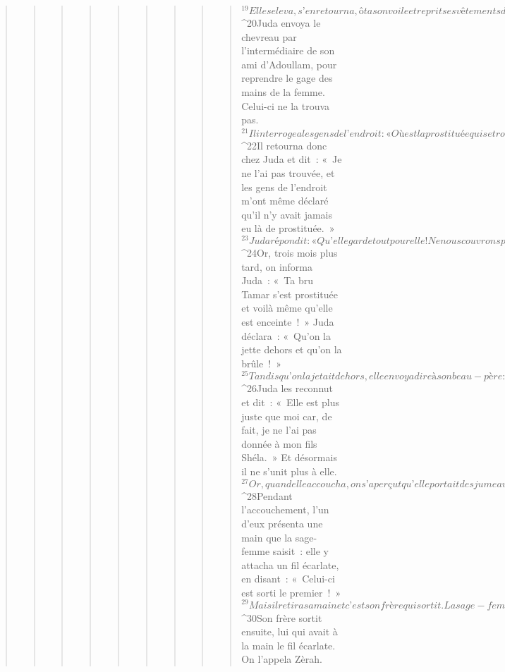 \begin{verse}
\begin{verse}
\begin{verse}
\begin{verse}
\begin{verse}
\begin{verse}
\begin{verse}
\begin{verse}
\begin{verse}
${}^{19}Elle se leva, s’en retourna, ôta son voile et reprit ses vêtements de veuve.
${}^{20}Juda envoya le chevreau par l’intermédiaire de son ami d’Adoullam, pour reprendre le gage des mains de la femme. Celui-ci ne la trouva pas. 
${}^{21}Il interrogea les gens de l’endroit : « Où est la prostituée qui se trouvait à Énaïm, au bord de la route ? » Ils répondirent : « Il n’y a jamais eu là de prostituée. » 
${}^{22}Il retourna donc chez Juda et dit : « Je ne l’ai pas trouvée, et les gens de l’endroit m’ont même déclaré qu’il n’y avait jamais eu là de prostituée. » 
${}^{23}Juda répondit : « Qu’elle garde tout pour elle ! Ne nous couvrons pas de ridicule, moi qui lui ai envoyé un chevreau, et toi qui ne l’as pas trouvée ! »
${}^{24}Or, trois mois plus tard, on informa Juda : « Ta bru Tamar s’est prostituée et voilà même qu’elle est enceinte ! » Juda déclara : « Qu’on la jette dehors et qu’on la brûle ! » 
${}^{25}Tandis qu’on la jetait dehors, elle envoya dire à son beau-père : « C’est de l’homme à qui appartiennent ces objets que je suis enceinte. » Et elle ajouta : « Regarde donc bien à qui appartiennent le sceau à cacheter, le cordon et le bâton que voici ! » 
${}^{26}Juda les reconnut et dit : « Elle est plus juste que moi car, de fait, je ne l’ai pas donnée à mon fils Shéla. » Et désormais il ne s’unit plus à elle.
${}^{27}Or, quand elle accoucha, on s’aperçut qu’elle portait des jumeaux. 
${}^{28}Pendant l’accouchement, l’un d’eux présenta une main que la sage-femme saisit : elle y attacha un fil écarlate, en disant : « Celui-ci est sorti le premier ! » 
${}^{29}Mais il retira sa main et c’est son frère qui sortit. La sage-femme dit : « Quelle brèche tu as ouverte ! » Et on l’appela Pérès (c’est-à-dire : Brèche). 
${}^{30}Son frère sortit ensuite, lui qui avait à la main le fil écarlate. On l’appela Zèrah.
      

\end{verse}
\end{verse}
\end{verse}
\end{verse}
\end{verse}
\end{verse}
\end{verse}
\end{verse}
\end{verse}
